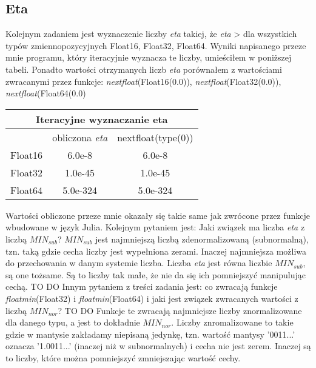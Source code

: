\documentclass[]{article}
\begin{document}
	
	\subsection{Eta}
	Kolejnym zadaniem jest wyznaczenie liczby \textit{eta} takiej, że \textit{eta} \textgreater{} dla wszystkich typów zmiennopozycyjnych Float16, Float32, Float64.
	Wyniki napisanego przeze mnie programu, który iteracyjnie wyznacza te liczby, umieściłem w poniższej tabeli. Ponadto wartości otrzymanych liczb \textit{eta} porównałem z wartościami zwracanymi przez funkcje: \mbox{\textit{nextfloat}(Float16(0.0))}, \mbox{\textit{nextfloat}(Float32(0.0))}, \mbox{\textit{nextfloat}(Float64(0.0)}
	
	\begin{table}[h!]
		\centering
		\label{tab:table1}
		\begin{tabular}{|c|c|c|}
			\multicolumn{3}{c}{Iteracyjne wyznaczanie eta}\\
			\hline
			& obliczona \textit{eta} & nextfloat(type(0))  \\
			\hline
			Float16 & 6.0e-8 & 6.0e-8 \\
			\hline
			Float32 & 1.0e-45 & 1.0e-45 \\
			\hline
			Float64 & 5.0e-324 & 5.0e-324 \\
			\hline
		\end{tabular}
	\end{table}

	Wartości obliczone przeze mnie okazały się takie same jak zwrócone przez funkcje wbudowane w język Julia.
	Kolejnym pytaniem jest: Jaki związek ma liczba \textit{eta} z liczbą $MIN_{sub}$?\newline
	$MIN_{sub}$ jest najmniejszą liczbą zdenormalizowaną (subnormalną), tzn. taką gdzie cecha liczby jest wypełniona zerami. Inaczej najmniejsza możliwa do przechowania w danym systemie liczba. Liczba \textit{eta} jest równa liczbie $MIN_{sub}$, są one tożsame. Są to liczby tak małe, że nie da się ich pomniejszyć manipulując cechą.
	\colorbox{BurntOrange}{TO DO}\newline
	Innym pytaniem z treści zadania jest: co zwracają funkcje \textit{floatmin}(Float32) i \textit{floatmin}(Float64) i jaki jest związek zwracanych wartości z liczbą $MIN_{nor}$?\newline
		\colorbox{BurntOrange}{TO DO}
	Funkcje te zwracają najmniejsze liczby znormalizowane dla danego typu, a jest to dokładnie $MIN_{nor}$. Liczby znromalizowane to takie gdzie w mantysie zakładamy niepisaną jedynkę, tzn. wartość mantysy '0011...' oznacza '1.0011...' (inaczej niż w subnormalnych) i cecha nie jest zerem. Inaczej są to liczby, które można pomniejszyć zmniejszając wartość cechy.
\end{document}
